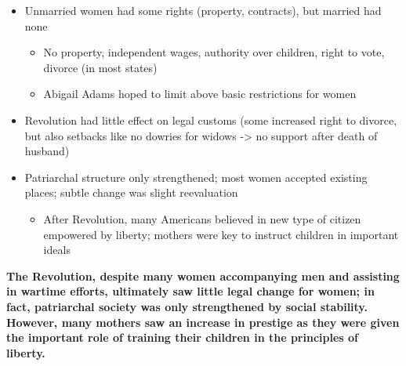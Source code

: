 \documentclass[a4paper]{article}
\begin{document}
{\begin{itemize}
\begin{itemize}
                \end{itemize}
                \item Unmarried women had some rights (property, contracts), but married had none
                \begin{itemize}
                    \item No property, independent wages, authority over children, right to vote, divorce (in most states)
                    \item Abigail Adams hoped to limit above basic restrictions for women
                \end{itemize}
                \item Revolution had little effect on legal customs (some increased right to divorce, but also setbacks like no dowries for widows -> no support after death of husband)
                \item Patriarchal structure only strengthened; most women accepted existing places; subtle change was slight reevaluation
                \begin{itemize}
                    \item After Revolution, many Americans believed in new type of citizen empowered by liberty; mothers were key to instruct children in important ideals
                \end{itemize}
            \end{itemize}
            \textbf{The Revolution, despite many women accompanying men and assisting in wartime efforts, ultimately saw little legal change for women; in fact, patriarchal society was only strengthened by social stability. However, many mothers saw an increase in prestige as they were given the important role of training their children in the principles of liberty.}}
\end{document}
